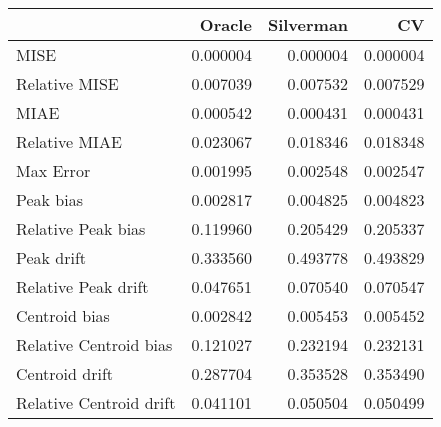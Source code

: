 \begin{tabular}{lrrr}
  \hline
 & Oracle & Silverman & CV \\ 
  \hline
MISE & 0.000004 & 0.000004 & 0.000004 \\ 
  Relative MISE & 0.007039 & 0.007532 & 0.007529 \\ 
  MIAE & 0.000542 & 0.000431 & 0.000431 \\ 
  Relative MIAE & 0.023067 & 0.018346 & 0.018348 \\ 
  Max Error & 0.001995 & 0.002548 & 0.002547 \\ 
  Peak bias & 0.002817 & 0.004825 & 0.004823 \\ 
  Relative Peak bias & 0.119960 & 0.205429 & 0.205337 \\ 
  Peak drift & 0.333560 & 0.493778 & 0.493829 \\ 
  Relative Peak drift & 0.047651 & 0.070540 & 0.070547 \\ 
  Centroid bias & 0.002842 & 0.005453 & 0.005452 \\ 
  Relative Centroid bias & 0.121027 & 0.232194 & 0.232131 \\ 
  Centroid drift & 0.287704 & 0.353528 & 0.353490 \\ 
  Relative Centroid drift & 0.041101 & 0.050504 & 0.050499 \\ 
   \hline
\end{tabular}
